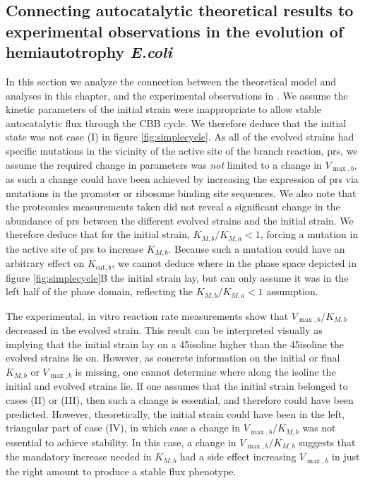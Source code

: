 \subsection{Connecting autocatalytic theoretical results to experimental observations in the evolution of hemiautotrophy \emph{E.coli}}
In this section we analyze the connection between the theoretical model and analyses in this chapter, and the experimental observations in \cite{Antonovsky2016-jy}.
We assume the kinetic parameters of the initial strain were inappropriate to allow stable autocatalytic flux through the CBB cycle.
We therefore deduce that the initial state was not case (I) in figure \ref{fig:simplecycle}.
As all of the evolved strains had specific mutations in the vicinity of the active site of the branch reaction, prs, we assume the required change in parameters was \emph{not} limited to a change in $V_{\max,b}$, as such a change could have been achieved by increasing the expression of prs via mutations in the promoter or ribosome binding site sequences.
We also note that the proteomics measurements taken did not reveal a significant change in the abundance of prs between the different evolved strains and the initial strain.
We therefore deduce that for the initial strain, $K_{M,b}/K_{M,a}<1$, forcing a mutation in the active site of prs to increase $K_{M,b}$.
Because such a mutation could have an arbitrary effect on $K_{\text{cat},b}$, we cannot deduce where in the phase space depicted in figure \ref{fig:simplecycle}B the initial strain lay, but can only assume it was in the left half of the phase domain, reflecting the $K_{M,b}/K_{M,a}<1$ assumption.

The experimental, in vitro reaction rate measurements show that $V_{\max,b}/K_{M,b}$ decreased in the evolved strain.
This result can be interpreted visually as implying that the initial strain lay on a 45\degree isoline higher than the 45\degree isoline the evolved strains lie on.
However, as concrete information on the initial or final $K_{M,b}$ or $V_{\max,b}$ is missing, one cannot determine where along the isoline the initial and evolved strains lie.
If one assumes that the initial strain belonged to cases (II) or (III), then such a change is essential, and therefore could have been predicted.
However, theoretically, the initial strain could have been in the left, triangular part of case (IV), in which case a change in $V_{\max,b}/K_{M,b}$ was not essential to achieve stability.
In this case, a change in $V_{\max,b}/K_{M,b}$ suggests that the mandatory increase needed in $K_{M,b}$ had a side effect increasing $V_{\max,b}$ in just the right amount to produce a stable flux phenotype.

